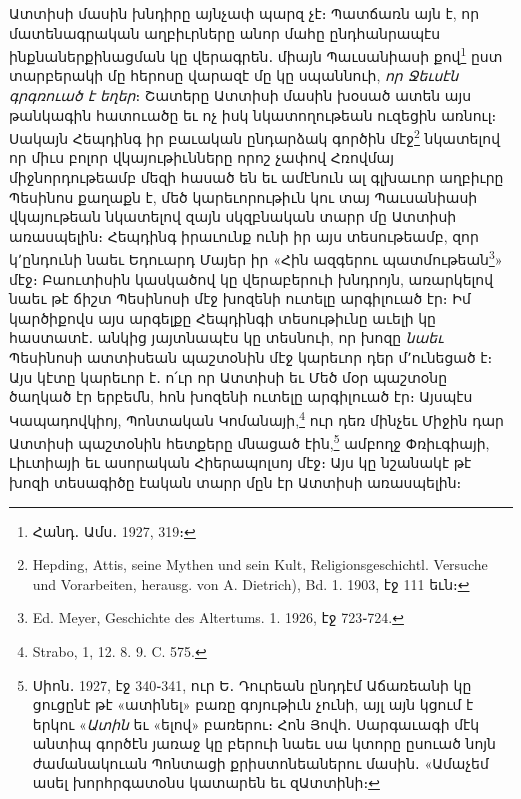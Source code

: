 \documentclass{article}
\begin{document}
{Ատտիսի մասին խնդիրը այնչափ պարզ չէ։ Պատճառն այն է, որ մատենագրական աղբիւրները անոր մահը ընդհանրապէս ինքնաներքինացման կը վերագրեն․ միայն Պաւսանիասի քով\footnote{Հանդ․ Ամս․ 1927, 319։} ըստ տարբերակի մը հերոսը վարազէ մը կը սպաննուի, \emph{որ Ջեւսէն գրգռուած է եղեր}։ Շատերը Ատտիսի մասին խօսած ատեն այս թանկագին հատուածը եւ ոչ իսկ նկատողութեան ուզեցին առնուլ։ Սակայն Հեպդինգ իր բաւական ընդարձակ գործին մէջ\footnote{Hepding, Attis, seine Mythen und sein Kult, Religionsgeschichtl. Versuche und Vorarbeiten, herausg. von A. Dietrich), Bd. 1. 1903, էջ 111 եւն։} նկատելով որ միւս բոլոր վկայութիւնները որոշ չափով Հռովմայ միջնորդութեամբ մեզի հասած են եւ ամէնուն ալ գլխաւոր աղբիւրը Պեսինոս քաղաքն է, մեծ կարեւորութիւն կու տայ Պաւսանիասի վկայութեան նկատելով զայն սկզբնական տարր մը Ատտիսի առասպելին։ Հեպդինգ իրաւունք ունի իր այս տեսութեամբ, զոր կ՚ընդունի նաեւ Եդուարդ Մայեր իր «Հին ազգերու պատմութեան\footnote{Ed. Meyer, Geschichte des Altertums. 1. 1926, էջ 723֊724.}» մէջ։ Բաուտիսին կասկածով կը վերաբերուի խնդրոյն, առարկելով նաեւ թէ ճիշտ Պեսինոսի մէջ խոզենի ուտելը արգիլուած էր։ Իմ կարծիքովս այս արգելքը Հեպդինգի տեսութիւնը աւելի կը հաստատէ․ անկից յայտնապէս կը տեսնուի, որ խոզը \emph{նաեւ} Պեսինոսի ատտիսեան պաշտօնին մէջ կարեւոր դեր մ՚ունեցած է։ Այս կէտը կարեւոր է․ ո՛ւր որ Ատտիսի եւ Մեծ մօր պաշտօնը ծաղկած էր երբեմն, հոն խոզենի ուտելը արգիլուած էր։ Այսպէս Կապադովկիոյ, Պոնտական Կոմանայի,\footnote{Strabo, 1, 12. 8. 9. C. 575.} ուր դեռ մինչեւ Միջին դար Ատտիսի պաշտօնին հետքերը մնացած էին,\footnote{Սիոն․ 1927, էջ 340֊341, ուր Ե․ Դուրեան ընդդէմ Աճառեանի կը ցուցընէ թէ «ատինել» բառը գոյութիւն չունի, այլ այն կցում է երկու «\emph{Ատին} եւ «ելով» բառերու։ Հոն Յովհ․ Սարգաւագի մէկ անտիպ գործէն յառաջ կը բերուի նաեւ սա կտորը ըսուած նոյն ժամանակուան Պոնտացի քրիստոնեաներու մասին․ «Ամաչեմ ասել խորհրգատօնս կատարեն եւ զԱտտինի։} ամբողջ Փռիւգիայի, Լիւտիայի եւ ասորական Հիերապոլսոյ մէջ։ Այս կը նշանակէ թէ խոզի տեսագիծը էական տարր մըն էր Ատտիսի առասպելին։

}
\end{document}
